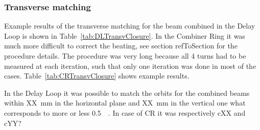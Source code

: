 \subsubsection{Transverse matching}

Example results of the transverse matching for the beam combined in the Delay Loop is 
shown in Table~\ref{tab:DLTransvClosure}. 
In the Combiner Ring it was much more difficult to correct the beating,
see section refToSection for the procedure details.
The procedure was very long because all 4 turns had to be measured at each iteration,
such that only one iteration was done in most of the cases. 
Table~\ref{tab:CRTransvClosure} shows example results.

In the Delay Loop it was possible to match the orbits for the combined beams within XX~mm in the horizontal plane 
and XX~mm in the vertical one what corresponds to more or less 0.5~\textsigma~. 
In case of CR it was respectively cXX and cYY? 



%
  

